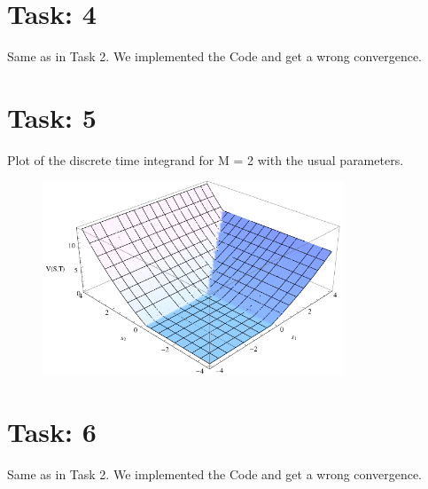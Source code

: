 \documentclass{article}
\begin{document}
\section*{Task: 4}
Same as in Task 2. We implemented the Code and get a wrong convergence. 

\section*{Task: 5}
Plot of the discrete time integrand for M = 2 with the usual parameters.
\begin{figure}[htbp]
  \centering
     \includegraphics[width=0.8\textwidth]{../Task05/task05_plot.pdf}
\end{figure}

\section*{Task: 6}
Same as in Task 2. We implemented the Code and get a wrong convergence. %
\end{document}

